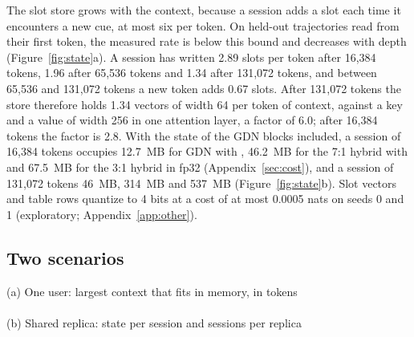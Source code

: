 The slot store grows with the context, because a session adds a slot each time it encounters a new
cue, at most six per token. On held-out trajectories read from their first token, the measured
rate is below this bound and decreases with depth (Figure~\ref{fig:state}a). A session has
written 2.89 slots per token after 16,384 tokens, 1.96 after 65,536 tokens and 1.34 after 131,072
tokens, and between 65,536 and 131,072 tokens a new token adds 0.67 slots. After 131,072 tokens
the store therefore holds 1.34 vectors of width 64 per token of context, against a key and a value
of width 256 in one attention layer, a factor of 6.0; after 16,384 tokens the factor is 2.8. With
the state of the GDN blocks included, a session of 16,384 tokens occupies 12.7~MB for GDN with
\ingram{}, 46.2~MB for the 7:1 hybrid with \ingram{} and 67.5~MB for the 3:1 hybrid in fp32
(Appendix~\ref{sec:cost}), and a session of 131,072 tokens 46~MB, 314~MB and 537~MB
(Figure~\ref{fig:state}b). Slot vectors and table rows quantize to 4 bits at a cost of at most
0.0005 nats on seeds 0 and 1 (exploratory; Appendix~\ref{app:other}).

\subsection{Two scenarios}
\label{sec:serving-local}

\begin{table}[tb]
\centering
\footnotesize
\setlength{\tabcolsep}{4pt}
{\small (a) One user: largest context that fits in memory, in tokens}\\[3pt]
\\[8pt]
{\small (b) Shared replica: state per session and sessions per replica}\\[3pt]

\caption{Two scenarios from a roofline model. (a) A model shaped like Qwen3.8-Flash-Next (48
layers, 12 of them sparse attention as released) serving one user: weights and N-gram tables at
4.5 bits per parameter, attention cache in 16-bit floats, \ingram{} with slot width 512 in 16-bit
floats, 1.5 slots per token and 24 bytes of index per slot. The model may use 110~GB of the
laptop's memory and 115~GB of the mini PC's; the laptop has 546~GB/s of memory bandwidth and the
mini PC 273~GB/s. On the first machine the cache and the weights outside the experts are in 22~GB
of the GPU memory, and the experts, the tables and the slot store are in 120~GB of system memory.
(b) A model shaped like Kimi K3.1 Pro (69 linear and 24 sparse-attention layers as released) on a
replica of 32 accelerators with 141~GB of memory each, 90\% of it usable: weights of 1,561~GB as
released (4.5 bits per parameter on average), attention cache in 16-bit floats, sessions limited by the accelerator memory left after
the weights, removed attention layers become linear layers, and
\ingram{} uses slot width 1,024 in 16-bit floats with 1.5 slots per token and 24 bytes of index
per slot, stored in host memory.}
\label{tab:serving}
\end{table}

